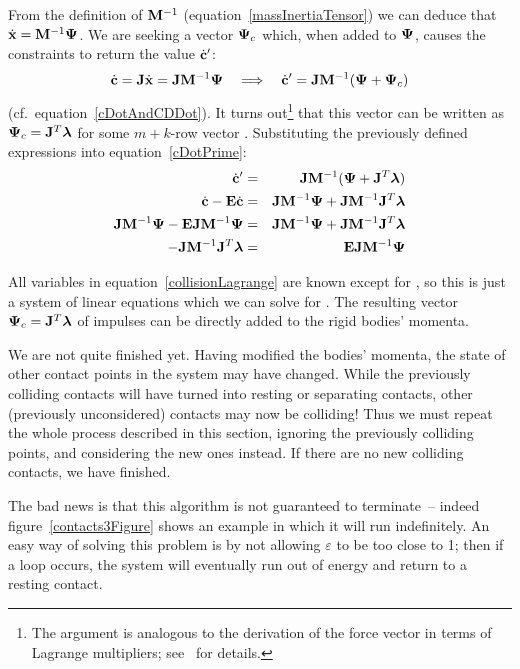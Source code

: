 From the definition of $\m{M}^{-1}$ (equation~\ref{massInertiaTensor}) we can deduce that
$\dot{\ve{x}} = \m{M}^{-1}\ve{\Psi}$. We are seeking a vector $\ve{\Psi}_c$ which, when
added to $\ve{\Psi}$, causes the constraints to return the value $\dot{\ve{c}}'$:
\begin{equation} \label{cDotPrime}
\dot{\ve{c}} = \m{J}\dot{\ve{x}} = \m{J}\m{M}^{-1}\ve{\Psi} \quad\Longrightarrow\quad
    \dot{\ve{c}}' = \m{J}\m{M}^{-1}(\ve{\Psi} + \ve{\Psi}_c)
\end{equation}
(cf.\ equation~\ref{cDotAndCDDot}).
It turns out\footnote{The argument is analogous to the derivation of the force vector in terms of
Lagrange multipliers; see~\cite{BaraffWitkin:97} for details.} that this vector can be written as
$\ve{\Psi}_c = \m{J}^T\ve{\lambda}$ for some $m+k$-row vector \ve{\lambda}. Substituting the
previously defined expressions into equation~\ref{cDotPrime}:
\begin{eqnarray}
\dot{\ve{c}}' &=& \m{J}\m{M}^{-1}(\ve{\Psi} + \m{J}^T\ve{\lambda}) \nonumber\\
\dot{\ve{c}} - \m{E}\dot{\ve{c}} &=&
    \m{J}\m{M}^{-1}\ve{\Psi} + \m{J}\m{M}^{-1}\m{J}^T\ve{\lambda} \nonumber\\
\m{J}\m{M}^{-1}\ve{\Psi} - \m{E}\m{J}\m{M}^{-1}\ve{\Psi} & = &
    \m{J}\m{M}^{-1}\ve{\Psi} + \m{J}\m{M}^{-1}\m{J}^T\ve{\lambda} \nonumber\\
-\m{J}\m{M}^{-1}\m{J}^T\ve{\lambda} &=& \m{E}\m{J}\m{M}^{-1}\ve{\Psi} \label{collisionLagrange}
\end{eqnarray}

All variables in equation~\ref{collisionLagrange} are known except for \ve{\lambda}, so this is
just a system of linear equations which we can solve for \ve{\lambda}. The resulting vector
$\ve{\Psi}_c = \m{J}^T\ve{\lambda}$ of impulses can be directly added to the rigid bodies' momenta.

We are not quite finished yet. Having modified the bodies' momenta, the state of other contact
points in the system may have changed. While the previously colliding contacts will have
turned into resting or separating contacts, other (previously unconsidered) contacts may now
be colliding! Thus we must repeat the whole process described in this section, ignoring the
previously colliding points, and considering the new ones instead. If there are no new colliding
contacts, we have finished.

The bad news is that this algorithm is not guaranteed to terminate~-- indeed
figure~\ref{contacts3Figure} shows an example in which it will run indefinitely. An easy way of
solving this problem is by not allowing $\varepsilon$ to be too close to 1; then if a loop
occurs, the system will eventually run out of energy and return to a resting contact.

